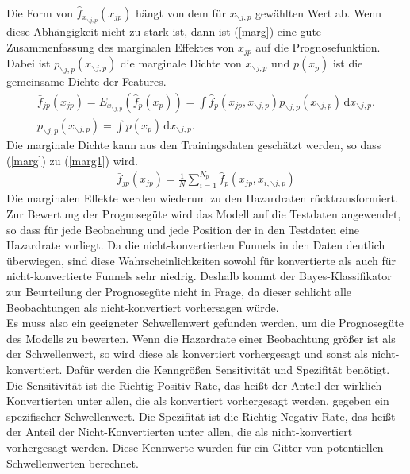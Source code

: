 Die Form von $\hat{f}_{x_{\backslash j,p}}(x_{jp})$ hängt von dem für $x_{\backslash j,p}$ gewählten Wert ab. Wenn diese Abhängigkeit nicht zu stark ist, dann ist (\ref{marg}) eine gute Zusammenfassung des marginalen Effektes von $x_{jp}$ auf die Prognosefunktion. Dabei ist $p_{\backslash j,p}(x_{\backslash j,p})$ die marginale Dichte von $x_{\backslash j,p}$ und $p(x_p)$ ist die gemeinsame Dichte der Features.
\begin{align}
	\bar{f}_{jp}(x_{jp}) = E_{x_{\backslash j,p}}(\hat{f}_p(x_p)) = \int \! \hat{f}_p(x_{jp},x_{\backslash j,p}) p_{\backslash j,p}(x_{\backslash j,p}) \, \mathrm{d}x_{\backslash j,p}. \label{marg} \\
	p_{\backslash j,p}(x_{\backslash j,p}) = \int \! p(x_p) \, \mathrm{d}x_{\backslash j,p}.
\end{align}
Die marginale Dichte kann aus den Trainingsdaten geschätzt werden, so dass (\ref{marg}) zu (\ref{marg1}) wird.
\begin{align}
	\bar{f}_{jp}(x_{jp}) = \frac{1}{N} \sum_{i=1}^{N_p} \hat{f}_p(x_{jp},x_{i,\backslash j,p}) \label{marg1}
\end{align}
Die marginalen Effekte werden wiederum zu den Hazardraten rücktransformiert.\\
Zur Bewertung der Prognosegüte wird das Modell auf die Testdaten angewendet, so dass für jede Beobachung und jede Position der in den Testdaten eine Hazardrate vorliegt. Da die nicht-konvertierten Funnels in den Daten deutlich überwiegen, sind diese Wahrscheinlichkeiten sowohl für konvertierte als auch für nicht-konvertierte Funnels sehr niedrig. Deshalb kommt der Bayes-Klassifikator zur Beurteilung der Prognosegüte nicht in Frage, da dieser schlicht alle Beobachtungen als nicht-konvertiert vorhersagen würde.\\
Es muss also ein geeigneter Schwellenwert gefunden werden, um die Prognosegüte des Modells zu bewerten. Wenn die Hazardrate einer Beobachtung größer ist als der Schwellenwert, so wird diese als konvertiert vorhergesagt und sonst als nicht-konvertiert. Dafür werden die Kenngrößen Sensitivität und Spezifität benötigt. Die Sensitivität ist die Richtig Positiv Rate, das heißt der Anteil der wirklich Konvertierten unter allen, die als konvertiert vorhergesagt werden, gegeben ein spezifischer Schwellenwert. Die Spezifität ist die Richtig Negativ Rate, das heißt der Anteil der Nicht-Konvertierten unter allen, die als nicht-konvertiert vorhergesagt werden. Diese Kennwerte wurden für ein Gitter von potentiellen Schwellenwerten berechnet.\\
